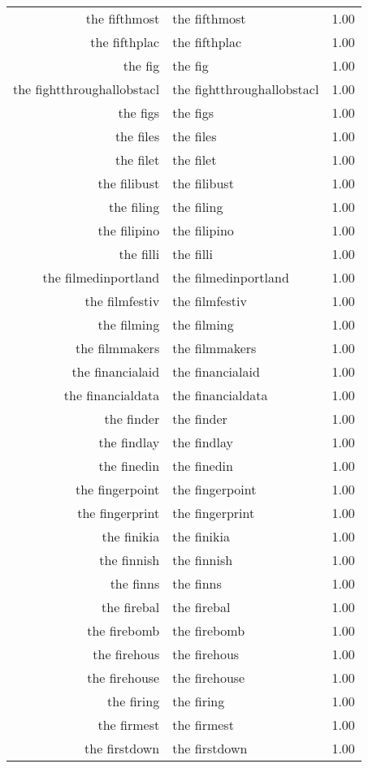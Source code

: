 \begin{table}[ht]
\begin{tabular}{rlr}
  the fifthmost & the fifthmost & 1.00 \\ 
  the fifthplac & the fifthplac & 1.00 \\ 
  the fig & the fig & 1.00 \\ 
  the fightthroughallobstacl & the fightthroughallobstacl & 1.00 \\ 
  the figs & the figs & 1.00 \\ 
  the files & the files & 1.00 \\ 
  the filet & the filet & 1.00 \\ 
  the filibust & the filibust & 1.00 \\ 
  the filing & the filing & 1.00 \\ 
  the filipino & the filipino & 1.00 \\ 
  the filli & the filli & 1.00 \\ 
  the filmedinportland & the filmedinportland & 1.00 \\ 
  the filmfestiv & the filmfestiv & 1.00 \\ 
  the filming & the filming & 1.00 \\ 
  the filmmakers & the filmmakers & 1.00 \\ 
  the financialaid & the financialaid & 1.00 \\ 
  the financialdata & the financialdata & 1.00 \\ 
  the finder & the finder & 1.00 \\ 
  the findlay & the findlay & 1.00 \\ 
  the finedin & the finedin & 1.00 \\ 
  the fingerpoint & the fingerpoint & 1.00 \\ 
  the fingerprint & the fingerprint & 1.00 \\ 
  the finikia & the finikia & 1.00 \\ 
  the finnish & the finnish & 1.00 \\ 
  the finns & the finns & 1.00 \\ 
  the firebal & the firebal & 1.00 \\ 
  the firebomb & the firebomb & 1.00 \\ 
  the firehous & the firehous & 1.00 \\ 
  the firehouse & the firehouse & 1.00 \\ 
  the firing & the firing & 1.00 \\ 
  the firmest & the firmest & 1.00 \\ 
  the firstdown & the firstdown & 1.00 \\ 

\end{tabular}
\end{table}
